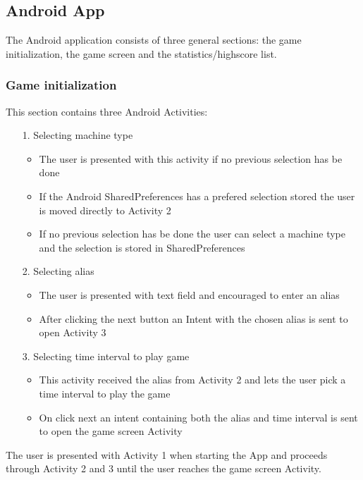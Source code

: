 \documentclass{article}
\begin{document}
\subsection{Android App}

The Android application consists of three general sections: the game initialization, the game screen and the statistics/highscore list.
\subsubsection{Game initialization}
This section contains three Android Activities:
\begin{itemize}
\item[1.] Selecting machine type
\begin{itemize}
\item The user is presented with this activity if no previous selection has be done
\item If the Android SharedPreferences has a prefered selection stored the user is moved directly to Activity 2
\item If no previous selection has be done the user can select a machine type and the selection is stored in SharedPreferences
\end{itemize}
\item[2.] Selecting alias
\begin{itemize}
\item The user is presented with text field and encouraged to enter an alias
\item After clicking the next button an Intent with the chosen alias is sent to open Activity 3
\end{itemize}
\item[3.] Selecting time interval to play game
\begin{itemize}
\item This activity received the alias from Activity 2 and lets the user pick a time interval to play the game
\item On click next an intent containing both the alias and time interval is sent to open the game screen Activity
\end{itemize}
\end{itemize}
The user is presented with Activity 1 when starting the App and proceeds through Activity 2 and 3 until the user reaches the game screen Activity.
\end{document}
